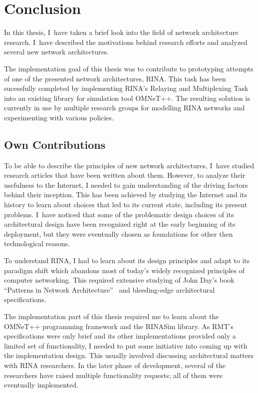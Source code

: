 \chapter{Conclusion}\label{conclusion}

    In this thesis, I~have taken a brief look into the field of network architecture research. I~have described the motivations behind research efforts and analyzed several new network architectures.

    The implementation goal of this thesis was to contribute to prototyping attempts of one of the presented network architectures, RINA. This task has been sucessfully completed by implementing RINA's Relaying and Multiplexing Task into an existing library for simulation tool OMNeT++. The resulting solution is currently in use by multiple research groups for modelling RINA networks and experimenting with various policies.

    \section{Own Contributions}

    To be able to describe the principles of new network architectures, I~have studied research articles that have been written about them. However, to analyze their usefulness to the Internet, I needed to gain understanding of the driving factors behind their inception. This has been achieved by studying the Internet and its history to learn about choices that led to its current state, including its present problems. I~have noticed that some of the problematic design choices of its architectural design have been recognized right at the early beginning of its deployment, but they were eventually chosen as foundations for other then technological reasons.

    To understand RINA, I had to learn about its design principles and adapt to its paradigm shift which abandons most of today's widely recognized principles of computer networking. This required extensive studying of John Day's book ``Patterns in Network Architecture''~\cite{Patterns} and bleeding-edge architectural specifications.

    The implementation part of this thesis required me to learn about the OMNeT++ programming framework and the RINASim library. As RMT's specifications were only brief and its other implementations provided only a limited set of functionality, I needed to put some initiative into coming up with the implementation design. This usually involved discussing architectural matters with RINA researchers. In the later phase of development, several of the researchers have raised multiple functionality requests; all of them were eventually implemented.

